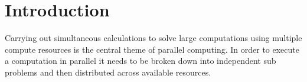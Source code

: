 \chapter{Introduction}
\label{sec:Introduction}

Carrying out simultaneous calculations to solve large computations 
using multiple compute resources is the central theme of parallel computing. 
In order to execute a computation in parallel it needs to be broken down 
into independent sub problems and then distributed across available resources.
